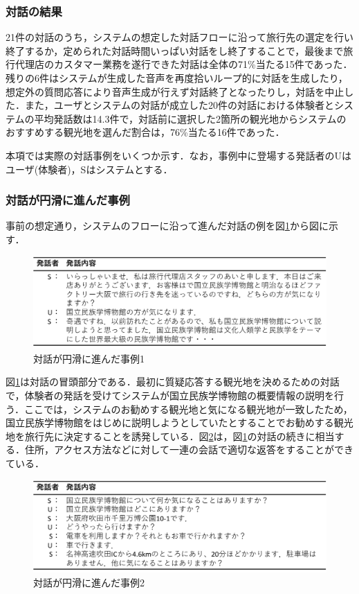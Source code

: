 \subsubsection{対話の結果}
21件の対話のうち，システムの想定した対話フローに沿って旅行先の選定を行い終了するか，定められた対話時間いっぱい対話をし終了することで，最後まで旅行代理店のカスタマー業務を遂行できた対話は全体の71\%当たる15件であった．残りの6件はシステムが生成した音声を再度拾いループ的に対話を生成したり，想定外の質問応答により音声生成が行えず対話終了となったりし，対話を中止した．また，ユーザとシステムの対話が成立した20件の対話における体験者とシステムの平均発話数は14.3件で，対話前に選択した2箇所の観光地からシステムのおすすめする観光地を選んだ割合は，76\%当たる16件であった．

本項では実際の対話事例をいくつか示す．なお，事例中に登場する発話者のUはユーザ(体験者)，Sはシステムとする．
\subsubsection*{対話が円滑に進んだ事例}
事前の想定通り，システムのフローに沿って進んだ対話の例を図\ref{対話が円滑に進んだ事例1}から図\label{対話が円滑に進んだ事例5}に示す．

\begin{figure}[th]
    \centering
    \includegraphics[scale=0.5]{pic/example01.pdf}
    \caption{対話が円滑に進んだ事例1}
    \label{対話が円滑に進んだ事例1}
\end{figure}

図\ref{対話が円滑に進んだ事例1}は対話の冒頭部分である．最初に質疑応答する観光地を決めるための対話で，体験者の発話を受けてシステムが国立民族学博物館の概要情報の説明を行う．ここでは，システムのお勧めする観光地と気になる観光地が一致したため，国立民族学博物館をはじめに説明しようとしていたとすることでお勧めする観光地を旅行先に決定することを誘発している．図\ref{対話が円滑に進んだ事例2}は，図\ref{対話が円滑に進んだ事例1}の対話の続きに相当する．住所，アクセス方法などに対して一連の会話で適切な返答をすることができている．

\begin{figure}[th]
    \centering
    \includegraphics[scale=0.5]{pic/example02.pdf}
    \caption{対話が円滑に進んだ事例2}
    \label{対話が円滑に進んだ事例2}
\end{figure}

